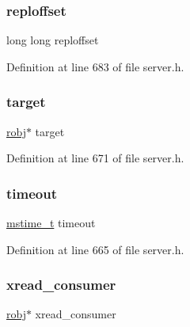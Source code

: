 \subsubsection{\texorpdfstring{reploffset}{reploffset}}
{\footnotesize\ttfamily long long reploffset}



Definition at line 683 of file server.\+h.

\mbox{\label{structblocking_state_acb665c66e7b32809e1371a4bdec1907e}} 
\subsubsection{\texorpdfstring{target}{target}}
{\footnotesize\ttfamily \hyperlink{server_8h_a540f174d2685422fbd7d12e3cd44c8e2}{robj}$\ast$ target}



Definition at line 671 of file server.\+h.

\mbox{\label{structblocking_state_a1adf524d2a0c7f9eb77f4f78e6c05620}} 
\subsubsection{\texorpdfstring{timeout}{timeout}}
{\footnotesize\ttfamily \hyperlink{redismodule_8h_a652ae61e2475bc8957454534544968fc}{mstime\+\_\+t} timeout}



Definition at line 665 of file server.\+h.

\mbox{\label{structblocking_state_acc7493490f2c56371b38f76c15ed7912}} 
\subsubsection{\texorpdfstring{xread\+\_\+consumer}{xread\_consumer}}
{\footnotesize\ttfamily \hyperlink{server_8h_a540f174d2685422fbd7d12e3cd44c8e2}{robj}$\ast$ xread\+\_\+consumer}



